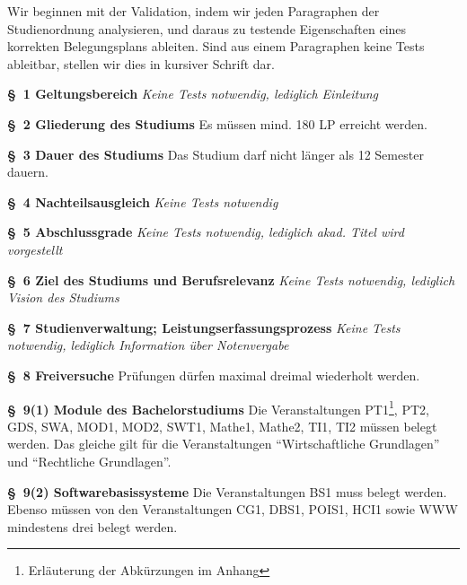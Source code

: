 \documentclass[ngerman]{article}
\begin{document}
Wir beginnen mit der Validation, indem wir jeden Paragraphen der Studienordnung analysieren, und daraus zu testende Eigenschaften eines korrekten Belegungsplans ableiten.
Sind aus einem Paragraphen keine Tests ableitbar, stellen wir dies in kursiver Schrift dar.

\setlength{\parindent}{0cm}

\begin{paracol}{2}
\textbf{§~1 Geltungsbereich}
\switchcolumn
\emph{Keine Tests notwendig, lediglich Einleitung}
\\
\switchcolumn*

\textbf{§~2 Gliederung des Studiums}
\switchcolumn
Es müssen mind. 180 LP erreicht werden.
\\
\switchcolumn*

\textbf{§~3 Dauer des Studiums}
\switchcolumn
Das Studium darf nicht länger als 12 Semester dauern.
\\
\switchcolumn*

\textbf{§~4 Nachteilsausgleich}
\switchcolumn
\emph{Keine Tests notwendig}
\\
\switchcolumn*

\textbf{§~5 Abschlussgrade}
\switchcolumn
\emph{Keine Tests notwendig, lediglich akad. Titel wird vorgestellt}
\\
\switchcolumn*

\textbf{§~6 Ziel des Studiums und Berufsrelevanz}
\switchcolumn
\emph{Keine Tests notwendig, lediglich Vision des Studiums}
\\
\switchcolumn*

\textbf{§~7 Studienverwaltung; Leistungserfassungsprozess}
\switchcolumn
\emph{Keine Tests notwendig, lediglich Information über Notenvergabe}
\\
\switchcolumn*

\textbf{§~8 Freiversuche}
\switchcolumn
Prüfungen dürfen maximal dreimal wiederholt werden.
\\
\switchcolumn*

\textbf{§~9(1) Module des Bachelorstudiums}
\switchcolumn
Die Veranstaltungen PT1\footnote{Erläuterung der Abkürzungen im Anhang}, PT2, GDS, SWA, MOD1, MOD2, SWT1, Mathe1, Mathe2, TI1, TI2 müssen belegt werden.
Das gleiche gilt für die Veranstaltungen ``Wirtschaftliche Grundlagen'' und ``Rechtliche Grundlagen''.
\\
\switchcolumn*

\textbf{§~9(2) Softwarebasissysteme}
\switchcolumn
Die Veranstaltungen BS1 muss belegt werden.
Ebenso müssen von den Veranstaltungen CG1, DBS1, POIS1, HCI1 sowie WWW mindestens drei belegt werden.
\\
\switchcolumn*


\end{paracol}
\end{document}
